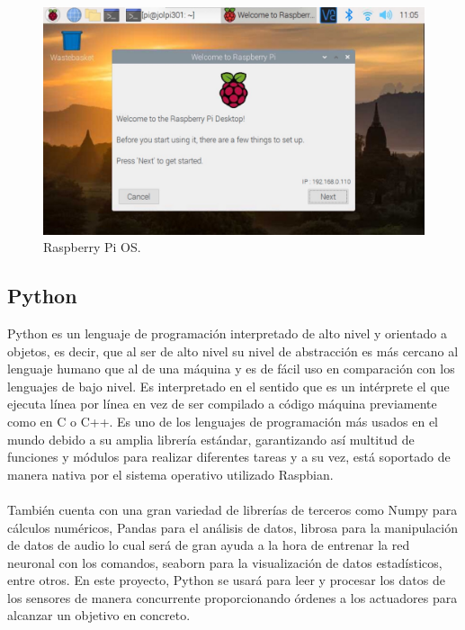 \begin{figure}[H]
  \centering
  \includegraphics[scale=0.3]{figs/raspbian} %
  \caption{Raspberry Pi OS.}
  \label{fig:raspbian}
\end{figure}


\subsection{Python}
\label{subsec:python}

Python es un lenguaje de programación interpretado de alto nivel y orientado a objetos, es decir, que al ser de alto nivel su nivel de abstracción es más cercano al lenguaje humano que al de una máquina y es de fácil uso en comparación con los lenguajes de bajo nivel. Es interpretado en el sentido que es un intérprete el que ejecuta línea por línea en vez de ser compilado a código máquina previamente como en C o C++. Es uno de los lenguajes de programación más usados en el mundo debido a su amplia librería estándar, garantizando así multitud de funciones y módulos para realizar diferentes tareas y a su vez, está soportado de manera nativa por el sistema operativo utilizado Raspbian.\\ \\ También cuenta con una gran variedad de librerías de terceros como Numpy para cálculos numéricos, Pandas para el análisis de datos, librosa para la manipulación de datos de audio lo cual será de gran ayuda a la hora de entrenar la red neuronal con los comandos, seaborn para la visualización de datos estadísticos, entre otros. En este proyecto, Python se usará para leer y procesar los datos de los sensores de manera concurrente proporcionando órdenes a los actuadores para alcanzar un objetivo en concreto.



